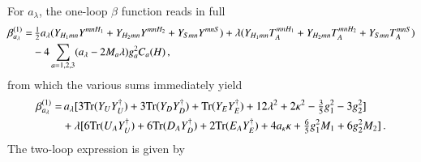 \documentclass[final,3p,times]{elsarticle}
\newcommand{\lamsq}{\lambda^2}
\newcommand{\kapsq}{\kappa^2}
\newcommand{\tr}{\mathrm{Tr}}
\begin{document}
For $a_\lambda$, the one-loop $\beta$ function reads in full
%
\begin{align}
\beta_{a_\lambda}^{(1)} =&\, \tfrac{1}{2}a_\lambda (Y_{H_1mn}Y^{mnH_1} + Y_{H_2mn}Y^{mnH_2}
 + Y_{Smn}Y^{mnS}) + \lambda (Y_{H_1mn}T_A^{mnH_1} + Y_{H_2mn}T_A^{mnH_2} 
+ Y_{Smn}T_A^{mnS}) \notag \\
%
&- 4\sum_{a=1,2,3} (a_\lambda - 2M_a\lambda)g_a^2C_a(H)\,,
\end{align}
%
from which the various sums immediately yield
%
\begin{align}
\beta_{a_\lambda}^{(1)} =&\, a_\lambda[3\tr( Y_U  Y_U^\dagger) + 3\tr( Y_D  Y_D^\dagger) 
+ \tr( Y_E  Y_E^\dagger) + 12\lamsq + 2\kapsq - \tfrac{3}{5}g_1^2 - 3g_2^2] 
\notag \\
%
&+ \lambda[6\tr( U_A  Y_U^\dagger) + 6\tr( D_A  Y_D^\dagger) + 2\tr( E_A  Y_E^\dagger)
+ 4a_\kappa\kappa + \tfrac{6}{5}g_1^2M_1 + 6g_2^2M_2]\,.
\end{align}
%
The two-loop expression is given by
\end{document}
